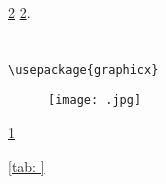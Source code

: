 \documentclass[a4paper]{article}
\newtheorem{}{}[section]
\begin{document}
{ 
\begin{ }
\ref{sec: }  \ref{sec: }.
\end{ }




\section{ }
\label{ }

 

\begin{ } 
\begin{verbatim}
\usepackage{graphicx}
\end{verbatim}

\begin{figure}[h!]
\begin{center}
\texttt{[image: .jpg]}
\end{center}
\caption{ }
\label{fig: }
\end{figure}

 \ref{fig: } 
\end{ }

\begin{ }  \ref{tab: } 






\section{ }
\label{sec: }


 


\subsection{ }
\label{subsec: }



\subsection{ }
\label{subsec: }




\end{ }}
\end{document}
